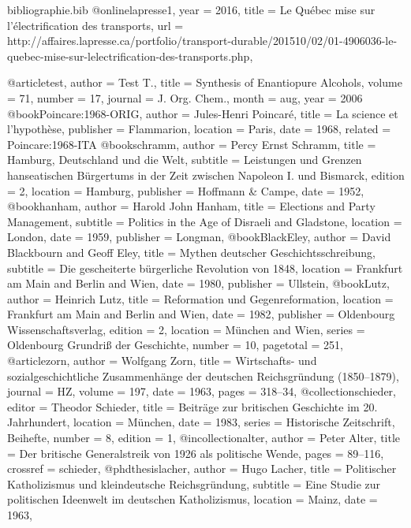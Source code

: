 
\begin{filecontents}{bibliographie.bib}
@online{lapresse1,
    year  = {2016},
    title = {Le Québec mise sur l'électrification des transports},
    url   = {http://affaires.lapresse.ca/portfolio/transport-durable/201510/02/01-4906036-le-quebec-mise-sur-lelectrification-des-transports.php},
}

@article{test,
    author   = {Test T.},
    title    = {Synthesis of Enantiopure Alcohols},
    volume   = {71},
    number   = {17},
    journal  = {J. Org. Chem.},
    month    = {aug},
    year     = {2006}
}
@book{Poincare:1968-ORIG,
    author    = {Jules-Henri Poincaré},
    title     = {La science et l’hypothèse},
    publisher = {Flammarion},
    location  = {Paris},
    date      = {1968},
    related   = {Poincare:1968-ITA}
}
@book{schramm,
    author    = {Percy Ernst Schramm},
    title     = {Hamburg, Deutschland und die Welt},
    subtitle  = {Leistungen und Grenzen hanseatischen Bürgertums in der Zeit zwischen Napoleon I. und Bismarck},
    edition   = {2},
    location  = {Hamburg},
    publisher = {Hoffmann \& Campe},
    date      = {1952},
}
@book{hanham,
    author    = {Harold John Hanham},
    title     = {Elections and Party Management},
    subtitle  = {Politics in the Age of Disraeli and Gladstone},
    location  = {London},
    date      = {1959},
    publisher = {Longman},
}
@book{BlackEley,
    author    = {David Blackbourn and Geoff Eley},
    title     = {Mythen deutscher Geschichtsschreibung},
    subtitle  = {Die gescheiterte bürgerliche Revolution von 1848},
    location  = {Frankfurt am Main and Berlin and Wien},
    date      = {1980},
    publisher = {Ullstein},
}
@book{Lutz,
    author    = {Heinrich Lutz},
    title     = {Reformation und Gegenreformation},
    location  = {Frankfurt am Main and Berlin and Wien},
    date      = {1982},
    publisher = {Oldenbourg Wissenschaftsverlag},
    edition   = {2},
    location  = {München and Wien},
    series    = {Oldenbourg Grundriß der Geschichte},
    number    = {10},
    pagetotal = {251},
}
@article{zorn,
    author    = {Wolfgang Zorn},
    title     = {Wirtschafts- und sozialgeschichtliche Zusammenhänge der deutschen Reichsgründung (1850–1879)},
    journal   = {HZ},
    volume    = {197},
    date      = {1963},
    pages     = {318–34},
}
@collection{schieder,
    editor    = {Theodor Schieder},
    title     = {Beiträge zur britischen Geschichte im 20. Jahrhundert},
    location  = {München},
    date      = {1983},
    series    = {Historische Zeitschrift, Beihefte},
    number    = {8},
    edition   = {1},
}
@incollection{alter,
    author    = {Peter Alter},
    title     = {Der britische Generalstreik von 1926 als politische Wende},
    pages     = {89–116},
    crossref  = {schieder},
}
@phdthesis{lacher,
    author   = {Hugo Lacher},
    title    = {Politischer Katholizismus und kleindeutsche Reichsgründung},
    subtitle = {Eine Studie zur politischen Ideenwelt im deutschen Katholizismus},
    location = {Mainz},
    date     = {1963},
}
\end{filecontents}
